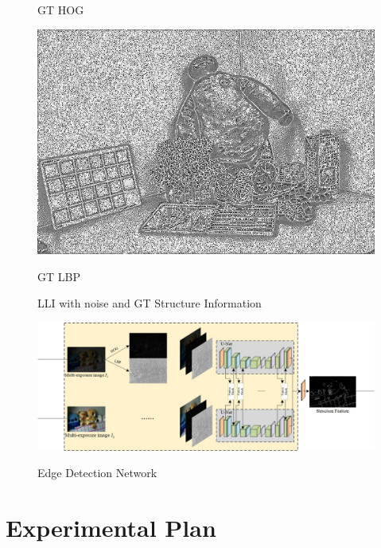 \documentclass[CJK,aspectratio=169]{beamer}  %
\begin{document}
\begin{frame}
\begin{figure}
\begin{minipage}{.32\textwidth}
				\captionsetup{font=scriptsize}
				\label{fig: GT_hog1}	
				\caption*{GT HOG}
			\end{minipage}
			\begin{minipage}{.32\textwidth}
				\centering
				\includegraphics[width=.8\linewidth]{picture/LLIE/My Architecture/Edge Detection/normal00269_lbp}
				\captionsetup{font=scriptsize}
				\label{fig: GT_lbp1}	
				\caption*{GT LBP}
			\end{minipage}
			\captionsetup{font=scriptsize}
			\caption{
				\label{fig: LLI Structure Information1}
				LLI with noise and GT Structure Information
			}
		\end{figure}
	\end{frame}
	
		\begin{frame}
		\begin{figure}
			\centering
			\begin{minipage}{\textwidth}
				\centering
				\includegraphics[width=\linewidth]{picture/LLIE/My Architecture/Edge Detection Network}
				\captionsetup{font=scriptsize}
				\label{fig: Edge Detection Network}	
				\caption{Edge Detection Network}
			\end{minipage}
		\end{figure}
	\end{frame}
	
	\section{Experimental Plan}
	
\end{document}
